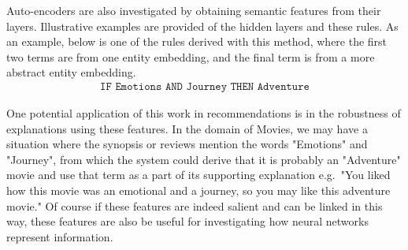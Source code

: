 Auto-encoders are also investigated by obtaining semantic features from their  layers.  Illustrative examples are provided of the hidden layers and these rules. As an example, below is one of the rules derived with this method, where the first two terms are from one entity embedding, and the final term is from a more abstract entity embedding.
\begin{align}\label{rule1}\texttt{IF Emotions  AND  Journey THEN Adventure}\end{align} 


One potential application of this work in recommendations is in the robustness of explanations using these features. In the domain of Movies, we may have a situation where the synopsis or reviews mention the words "Emotions" and "Journey", from which the system could derive that it is probably an "Adventure" movie and use that term as a part of its supporting explanation e.g.\ "You liked how this movie was an emotional and a journey, so you may like this adventure movie." Of course if these features are indeed salient and can be linked in this way, these features are also be useful for investigating how  neural networks represent information.


